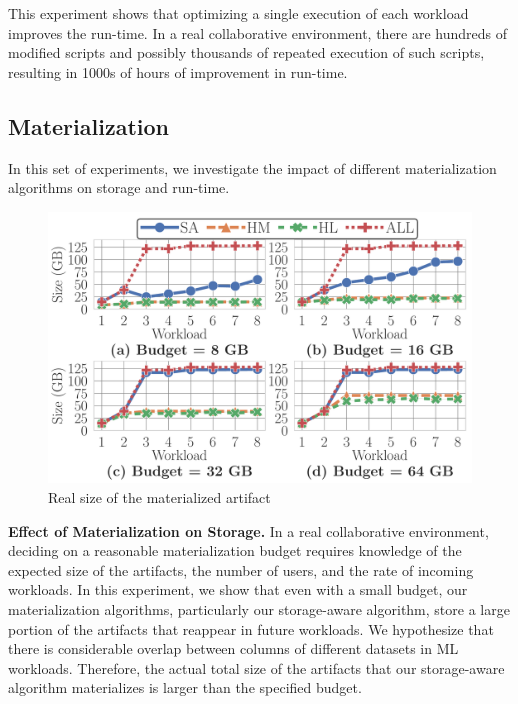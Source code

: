 This experiment shows that optimizing a single execution of each workload improves the run-time.
In a real collaborative environment, there are hundreds of modified scripts and possibly thousands of repeated execution of such scripts, resulting in 1000s of hours of improvement in run-time.

\subsection{Materialization}
In this set of experiments, we investigate the impact of different materialization algorithms on storage and run-time.

\begin{figure}[t]
\centering
\includegraphics[width=1.0\columnwidth]{images/experiment-results/kaggle_home_credit/materialization/mat_sizes}
\caption{Real size of the materialized artifact}
\label{exp-sa-vs-simple-size}
\vspace{-4mm}
\end{figure}
\textbf{Effect of Materialization on Storage.}
In a real collaborative environment, deciding on a reasonable materialization budget requires knowledge of the expected size of the artifacts, the number of users, and the rate of incoming workloads.
In this experiment, we show that even with a small budget, our materialization algorithms, particularly our storage-aware algorithm, store a large portion of the artifacts that reappear in future workloads.
We hypothesize that there is considerable overlap between columns of different datasets in ML workloads.
Therefore, the actual total size of the artifacts that our storage-aware algorithm materializes is larger than the specified budget.

